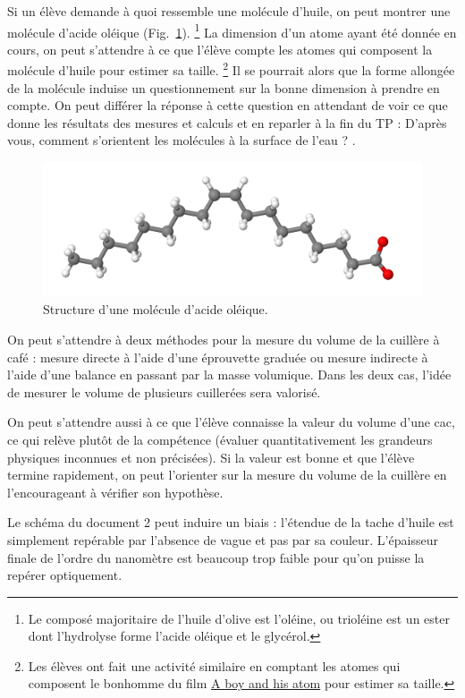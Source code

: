\documentclass[12pt,a4paper]{article}
\begin{document}
Si un élève demande à quoi ressemble une molécule d'huile, on peut montrer une molécule d'acide oléique (Fig.~\ref{fig:acide_oleique}).
\footnote{Le composé majoritaire de l'huile d'olive est l'oléine, ou trioléine est un ester dont l'hydrolyse forme l'acide oléique et le glycérol.}
La dimension d'un atome ayant été donnée en cours, on peut s'attendre à ce que l'élève compte les atomes qui composent la \og molécule d'huile \fg{} pour estimer sa taille.
\footnote{Les élèves ont fait une activité similaire en comptant les atomes qui composent le bonhomme du film \href{https://www.youtube.com/watch?v=oSCX78-8-q0}{A boy and his atom} pour estimer sa taille.}
Il se pourrait alors que la forme allongée de la molécule induise un questionnement sur la bonne dimension à prendre en compte.
On peut différer la réponse à cette question en attendant de voir ce que donne les résultats des mesures et calculs et en reparler à la fin du TP : \og D'après vous, comment s'orientent les molécules à la surface de l'eau ? \fg{}.

\begin{figure}
\center
\includegraphics[scale=0.4]{acide_oleique.png}
\caption{Structure d'une molécule d'acide oléique.}
\label{fig:acide_oleique}
\end{figure}

On peut s'attendre à deux méthodes pour la mesure du volume de la cuillère à café : mesure \og directe \fg{} à l'aide d'une éprouvette graduée ou mesure \og indirecte \fg{} à l'aide d'une balance en passant par la masse volumique.  
Dans les deux cas, l'idée de mesurer le volume de plusieurs cuillerées sera valorisé.

On peut s'attendre aussi à ce que l'élève connaisse la valeur du volume d'une cac, ce qui relève plutôt de la compétence \app{} (évaluer quantitativement les grandeurs physiques inconnues et non précisées).
Si la valeur est bonne et que l'élève termine rapidement, on peut l'orienter sur la mesure du volume de la cuillère en l'encourageant à vérifier son hypothèse.

Le schéma du document 2 peut induire un biais : l'étendue de la tache d'huile est simplement repérable par l'absence de vague et pas par sa couleur.
L'épaisseur finale de l'ordre du nanomètre est beaucoup trop faible pour qu'on puisse la repérer optiquement.
\end{document}
